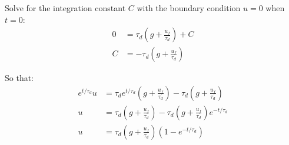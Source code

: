 \documentclass[../Interim_Report_Master]{subfiles}
\begin{document}
Solve for the integration constant $C$ with the boundary condition $u=0$ when $t=0$:
\begin{subequations}
	\begin{align}
	0 &= \tau_d\left(g + \frac{u_f}{\tau_d}\right) + C \\
	C &= -\tau_d\left(g + \frac{u_f}{\tau_d}\right) 
	\end{align}
\end{subequations}

So that:
\begin{subequations}
	\begin{align}
	e^{t/\tau_d}u &= \tau_de^{t/\tau_d}\left(g + \frac{u_f}{\tau_d}\right) - \tau_d\left(g + \frac{u_f}{\tau_d}\right) \\
	u &= \tau_d\left(g + \frac{u_f}{\tau_d}\right) - \tau_d\left(g + \frac{u_f}{\tau_d}\right)e^{-t/\tau_d} \\
	u &= \tau_d\left(g + \frac{u_f}{\tau_d}\right)(1-e^{-t/\tau_d})
	\end{align}
\end{subequations}
\end{document}
